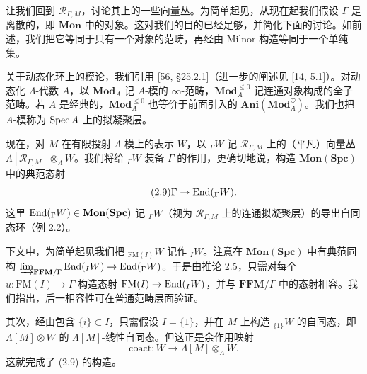 让我们回到 $\mathcal R_{\Gamma,M}$，讨论其上的一些向量丛。为简单起见，从现在起我们假设 $\Gamma$ 是离散的，即 $\mathbf{Mon}$ 中的对象。这对我们的目的已经足够，并简化下面的讨论。如前述，我们把它等同于只有一个对象的范畴，再经由 Milnor 构造等同于一个单纯集。

关于动态化环上的模论，我们引用 [56, §25.2.1]（进一步的阐述见 [14, 5.1]）。对动态化 $\Lambda$-代数 $A$，以 $\mathbf{Mod}_A$ 记 $A$-模的 $\infty$-范畴，$\mathbf{Mod}_A^{\le 0}$ 记连通对象构成的全子范畴。若 $A$ 是经典的，$\mathbf{Mod}_A^{\le 0}$ 也等价于前面引入的 $\mathbf{Ani}(\mathbf{Mod}_A^\heartsuit)$。我们也把 $A$-模称为 $\operatorname{Spec} A$ 上的拟凝聚层。

现在，对 $M$ 在有限投射 $\Lambda$-模上的表示 $W$，以 ${}_\Gamma W$ 记 $\mathcal R_{\Gamma,M}$ 上的（平凡）向量丛 $\Lambda[\mathcal R_{\Gamma,M}]\otimes_\Lambda W$。我们将给 ${}_\Gamma W$ 装备 $\Gamma$ 的作用，更确切地说，构造 $\mathbf{Mon}(\mathbf{Spc})$ 中的典范态射
\begin{equation}\tag{2.9}
\Gamma\to\operatorname{End}({}_\Gamma W).
\end{equation}
这里 $\operatorname{End}({}_\Gamma W)\in\mathbf{Mon}(\mathbf{Spc})$ 记 ${}_\Gamma W$（视为 $\mathcal R_{\Gamma,M}$ 上的连通拟凝聚层）的导出自同态环（例 2.2）。

下文中，为简单起见我们把 ${}_{\mathrm{FM}(I)}W$ 记作 ${}_I W$。注意在 $\mathbf{Mon}(\mathbf{Spc})$ 中有典范同构 $\varinjlim_{\mathbf{FFM}/\Gamma}\operatorname{End}({}_I W)\to\operatorname{End}({}_\Gamma W)$。于是由推论 2.5，只需对每个 $u:\mathrm{FM}(I)\to\Gamma$ 构造态射 $\mathrm{FM}(I)\to\operatorname{End}({}_I W)$，并与 $\mathbf{FFM}/\Gamma$ 中的态射相容。我们指出，后一相容性可在普通范畴层面验证。

其次，经由包含 $\{i\}\subset I$，只需假设 $I=\{1\}$，并在 $M$ 上构造 ${}_{\{1\}}W$ 的自同态，即 $\Lambda[M]\otimes W$ 的 $\Lambda[M]$-线性自同态。但这正是余作用映射
\begin{equation}\tag{2.10}
\mathrm{coact}:W\to\Lambda[M]\otimes_\Lambda W .
\end{equation}
这就完成了 (2.9) 的构造。

